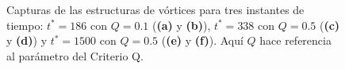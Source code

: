 \begin{figure}[H]
  \caption{Capturas de las estructuras de vórtices para tres instantes de tiempo: $t^* =186$ con $Q=0\text{.}1$ (\textbf{(a)} y \textbf{(b)}), $t^* =338$ con $Q=0\text{.}5$ (\textbf{(c)} y \textbf{(d)}) y $t^* = 1500$ con $Q=0\text{.}5$ (\textbf{(e)} y \textbf{(f)}). Aquí $Q$ hace referencia al parámetro del Criterio Q.}
  \label{fig:mosaico2-ac10}
\end{figure}




%  

